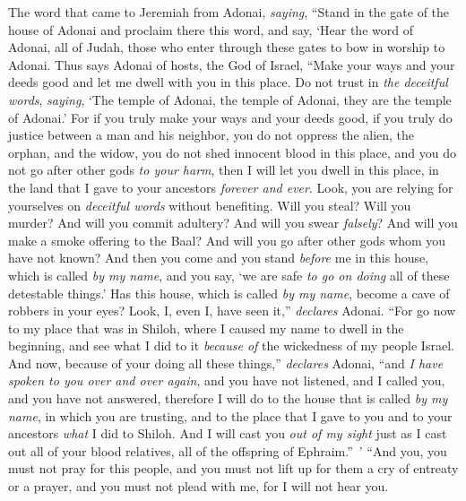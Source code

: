 \begin{biblechapter} %
 The word that came to Jeremiah from Adonai, \textit{saying},
\verse “Stand in the gate of the house of Adonai and proclaim there this word, and say, ‘Hear the word of Adonai, all of Judah, those who enter through these gates to bow in worship to Adonai.
\verse Thus says Adonai of hosts, the God of Israel, “Make your ways and your deeds good and let me dwell with you in this place.
\verse Do not trust in \textit{the deceitful words}, \textit{saying}, ‘The temple of Adonai, the temple of Adonai, they are the temple of Adonai.’
\verse For if you truly make your ways and your deeds good, if you truly do justice between a man and his neighbor,
\verse you do not oppress the alien, the orphan, and the widow, you do not shed innocent blood in this place, and you do not go after other gods \textit{to your harm},
\verse then I will let you dwell in this place, in the land that I gave to your ancestors \textit{forever and ever}.
\verse Look, you are relying for yourselves on \textit{deceitful words} without benefiting.
\verse Will you steal? Will you murder? And will you commit adultery? And will you swear \textit{falsely}? And will you make a smoke offering to the Baal? And will you go after other gods whom you have not known?
\verse And then you come and you stand \textit{before} me in this house, which is called \textit{by my name}, and you say, ‘we are safe \textit{to go on doing} all of these detestable things.’
\verse Has this house, which is called \textit{by my name}, become a cave of robbers in your eyes? Look, I, even I, have seen it,”  \textit{declares} Adonai.
\verse “For go now to my place that was in Shiloh, where I caused my name to dwell in the beginning, and see what I did to it \textit{because of} the wickedness of my people Israel.
\verse And now, because of your doing all these things,” \textit{declares} Adonai, “and \textit{I have spoken to you over and over again}, and you have not listened, and I called you, and you have not answered,
\verse therefore I will do to the house that is called \textit{by my name}, in which you are trusting, and to the place that I gave to you and to your ancestors \textit{what} I did to Shiloh.
\verse And I will cast you \textit{out of my sight} just as I cast out all of your blood relatives, all of the offspring of Ephraim.” ’
\verse “And you, you must not pray for this people, and you must not lift up for them a cry of entreaty or a prayer, and you must not plead with me, for I will not hear you.

\end{biblechapter}
